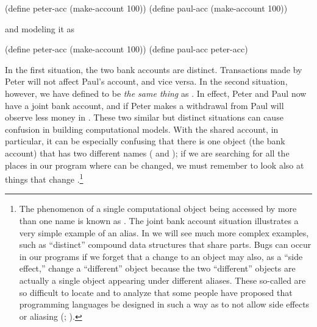 \begin{codeBlock}
(define peter-acc (make-account 100))
(define paul-acc (make-account 100))
\end{codeBlock}

\noindent
and modeling it as

\begin{codeBlock}
(define peter-acc (make-account 100))
(define paul-acc peter-acc)
\end{codeBlock}

\noindent
In the first situation, the two bank accounts are distinct.  Transactions made
by Peter will not affect Paul's account, and vice versa.  In the second
situation, however, we have defined  to be \emph{the same thing}
as .  In effect, Peter and Paul now have a joint bank account,
and if Peter makes a withdrawal from  Paul will observe less
money in .  These two similar but distinct situations can cause
confusion in building computational models.  With the shared account, in
particular, it can be especially confusing that there is one object (the bank
account) that has two different names ( and );
if we are searching for all the places in our program where  can
be changed, we must remember to look also at things that change
.\footnote{The phenomenon of a single computational object
being accessed by more than one name is known as .  The joint
bank account situation illustrates a very simple example of an alias.  In
 we will see much more complex examples, such as ``distinct''
compound data structures that share parts.  Bugs can occur in our programs if
we forget that a change to an object may also, as a ``side effect,'' change a
``different'' object because the two ``different'' objects are actually a
single object appearing under different aliases.  These so-called
 are so difficult to locate and to analyze that some
people have proposed that programming languages be designed in such a way as to
not allow side effects or aliasing (;
).}

